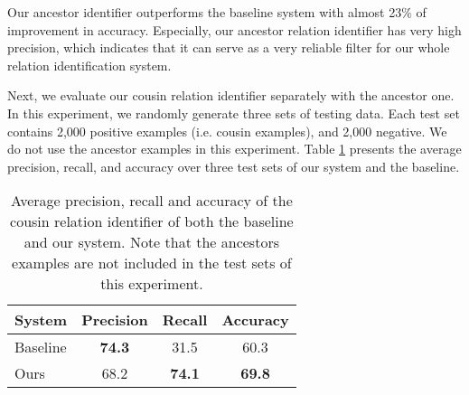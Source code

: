 Our ancestor identifier outperforms the baseline system with almost 23\% of improvement in accuracy. Especially, our ancestor relation identifier has very high precision, which indicates that it can serve as a very reliable filter for our whole relation identification system.

Next, we evaluate our cousin relation identifier separately with the ancestor one. In this experiment, we randomly generate three sets of testing data. Each test set contains 2,000 positive examples (i.e. cousin examples), and 2,000 negative. We do not use the ancestor examples in this experiment. Table \ref{table:exp2} presents the average precision, recall, and accuracy over three test sets of our system and the baseline.

\begin{table}[ht]
  \centering
{\small
  \begin{tabular}{|l|c|c|c|}
    \hline
    {\bf System} & {\bf Precision} & {\bf Recall} & {\bf Accuracy} \\
    \hline
    \hline
	Baseline   &    {\bf 74.3}  &  31.5  &    60.3  \\
	\hline
	Ours  &     68.2  &  {\bf 74.1}  &    {\bf 69.8}  \\
    \hline
  \end{tabular}
  \caption{Average precision, recall and accuracy of the cousin relation identifier of both the baseline and our system. Note that the ancestors examples are not included in the test sets of this experiment.}
  \label{table:exp2}
  }
\end{table}



